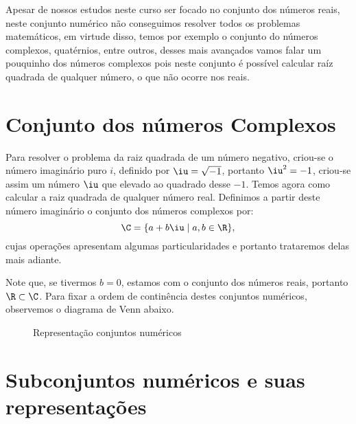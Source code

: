 



Apesar de nossos estudos neste curso ser focado no conjunto dos números reais, neste conjunto numérico não conseguimos resolver todos os problemas matemáticos, em virtude disso, temos por exemplo o conjunto do números complexos, quatérnios, entre outros, desses mais avançados vamos falar um pouquinho dos números complexos pois neste conjunto é possível calcular raíz quadrada de qualquer número, o que não ocorre nos reais.

\section{Conjunto dos números Complexos}

Para resolver o problema da raiz quadrada de um número negativo, criou-se o número imaginário puro $i$, definido por $\iu= \sqrt{-1}$, portanto $\iu^2= -1$, criou-se assim um número $\iu$ que elevado ao quadrado desse $-1$. Temos agora como calcular a raiz quadrada de qualquer número real. Definimos a partir deste número imaginário o conjunto dos números complexos por:
\begin{equation}
\C= \{a + b\iu \mid a, b \in \R \} ,
\end{equation}
cujas operações apresentam algumas particularidades e portanto trataremos delas mais adiante.

Note que, se tivermos $b=0$, estamos com o conjunto dos números reais, portanto $\R \subset \C$. Para fixar a ordem de continência destes conjuntos numéricos, observemos o diagrama de Venn abaixo.

 \begin{figure}[H]
 \centering
    \caption{Representação conjuntos numéricos}
  \end{figure}

\section{Subconjuntos numéricos e suas representações}

